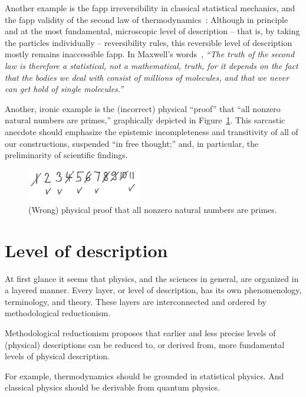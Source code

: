 Another example is the fapp irreversibility in classical statistical mechanics, and the fapp validity of the second law of thermodynamics~\cite{Myrvold2011237}:
Although in principle and at the most fundamental, microscopic level of description -- that is, by taking the particles individually -- reversibility rules,
this reversible level of description mostly remains inaccessible fapp.
In Maxwell's words~\cite[p.~279]{Maxwell-1878}, {\em ``The truth of the second law is therefore a statistical,
not a mathematical, truth, for it depends on the fact that
the bodies we deal with consist of millions of molecules,
and that we never can get hold of single molecules.''}

Another, ironic example is the (incorrect) physical ``proof'' that ``all nonzero natural numbers are primes,''
graphically depicted in Figure~\ref{2016-pu-book-chapter-eo-figure-prime}.
This sarcastic anecdote should emphasize the epistemic incompleteness and transitivity of all of our constructions,
suspended ``in free thought;''  and, in particular, the preliminarity of scientific findings.
\begin{figure}
\begin{center}
\includegraphics[width=5cm,angle=0]{2016-pu-book-chapter-eo-figure-primes}
\end{center}
\caption{
(Wrong) physical proof that all nonzero natural numbers are primes.
\label{2016-pu-book-chapter-eo-figure-prime}
}
\end{figure}

\section{Level of description}


At first glance it seems that physics, and the sciences in general, are organized in a layered manner.
Every layer, or level of description,  has its own phenomenology, terminology, and theory.
These layers are interconnected and ordered by methodological reductionism.

Methodological reductionism
proposes that earlier and less precise levels of (physical) descriptions can be reduced to, or derived from, more fundamental levels of physical description.

For example, thermodynamics should be grounded in statistical physics.
And classical physics should be derivable from quantum physics.



